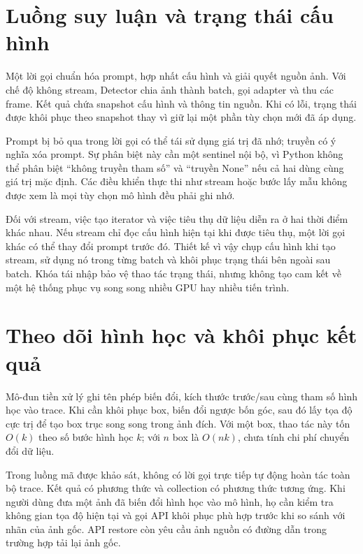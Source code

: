 \section{Luồng suy luận và trạng thái cấu hình}
Một lời gọi  chuẩn hóa prompt, hợp nhất cấu hình và giải quyết nguồn ảnh. Với chế độ không stream, Detector chia ảnh thành batch, gọi adapter và thu các frame. Kết quả chứa snapshot cấu hình và thông tin nguồn. Khi có lỗi, trạng thái được khôi phục theo snapshot thay vì giữ lại một phần tùy chọn mới đã áp dụng.

Prompt bị bỏ qua trong lời gọi có thể tái sử dụng giá trị đã nhớ; truyền  có ý nghĩa xóa prompt. Sự phân biệt này cần một sentinel nội bộ, vì Python không thể phân biệt ``không truyền tham số'' và ``truyền None'' nếu cả hai dùng cùng giá trị mặc định. Các điều khiển thực thi như stream hoặc bước lấy mẫu không được xem là mọi tùy chọn mô hình đều phải ghi nhớ.

Đối với stream, việc tạo iterator và việc tiêu thụ dữ liệu diễn ra ở hai thời điểm khác nhau. Nếu stream chỉ đọc cấu hình hiện tại khi được tiêu thụ, một lời gọi khác có thể thay đổi prompt trước đó. Thiết kế vì vậy chụp cấu hình khi tạo stream, sử dụng nó trong từng batch và khôi phục trạng thái bên ngoài sau batch. Khóa tái nhập bảo vệ thao tác trạng thái, nhưng không tạo cam kết về một hệ thống phục vụ song song nhiều GPU hay nhiều tiến trình.

\section{Theo dõi hình học và khôi phục kết quả}
Mô-đun tiền xử lý ghi tên phép biến đổi, kích thước trước/sau cùng tham số hình học vào trace. Khi cần khôi phục box,  biến đổi ngược bốn góc, sau đó lấy tọa độ cực trị để tạo box trục song song trong ảnh đích. Với một box, thao tác này tốn $O(k)$ theo số bước hình học $k$; với $n$ box là $O(nk)$, chưa tính chi phí chuyển đổi dữ liệu.

Trong luồng mã  được khảo sát, không có lời gọi trực tiếp tự động hoàn tác toàn bộ trace. Kết quả có phương thức  và collection có phương thức tương ứng. Khi người dùng đưa một ảnh đã biến đổi hình học vào mô hình, họ cần kiểm tra không gian tọa độ hiện tại và gọi API khôi phục phù hợp trước khi so sánh với nhãn của ảnh gốc. API restore còn yêu cầu ảnh nguồn có đường dẫn trong trường hợp tải lại ảnh gốc.

